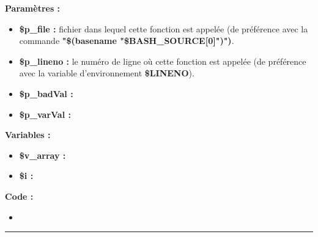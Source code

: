\documentclass[a4paper,10pt]{article}
\begin{document}
\begin{justify}
    \textbf{Paramètres :}

    \begin{itemize}
        \item \color{orange}\textbf{\$p\_file\color{white} :} \color{white} fichier dans lequel cette fonction est appelée (de préférence avec la commande \textbf{\textbf{"\$(\color{gray}basename \color{white}"\color{orange}\$BASH\_SOURCE[0]\color{white}")")}}.\\

        \item \color{orange}\textbf{\$p\_lineno\color{white} :} \color{white} le numéro de ligne où cette fonction est appelée (de préférence avec la variable d'environnement \textbf{\color{orange}\$LINENO}).\\

        \item \color{orange}\textbf{\$p\_badVal\color{white} :} \color{white}\\

        \item \color{orange}\textbf{\$p\_varVal\color{white} :} \color{white}\\
    \end{itemize}
\end{justify}
    
\begin{justify}
    \textbf{Variables :}

    \begin{itemize}
        \item \color{orange}\textbf{\$v\_array\color{white} :} \color{white}\\
        \item \color{orange}\textbf{\$i\color{white} :} \color{white}
    \end{itemize}
\end{justify}

\begin{justify}
    \textbf{Code :}
    \begin{itemize}
        \item 
    \end{itemize}

\end{justify}



\color{green}\par\noindent\rule{\textwidth}{0.4pt}\color{white}
\end{document}
